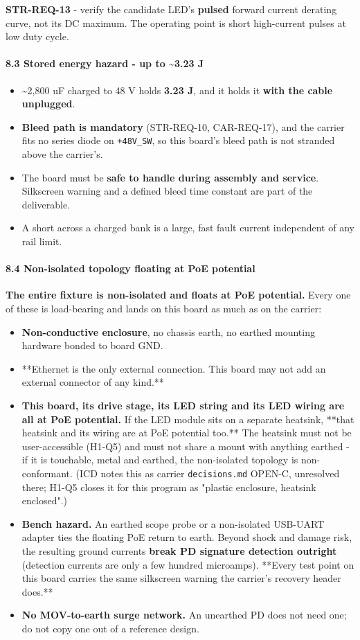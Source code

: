 \documentclass[11pt,a4paper]{article}
\begin{document}
\textbf{STR-REQ-13} - verify the candidate LED's \textbf{pulsed} forward current derating curve, not its DC maximum. The operating point is short high-current pulses at low duty cycle.

\paragraph*{8.3 Stored energy hazard - up to \textasciitilde{}3.23 J}
\begin{itemize}
\item \textasciitilde{}2,800 uF charged to 48 V holds \textbf{3.23 J}, and it holds it \textbf{with the cable unplugged}.
\item \textbf{Bleed path is mandatory} (STR-REQ-10, CAR-REQ-17), and the carrier fits no series diode
on \texttt{+48V\_SW}, so this board's bleed path is not stranded above the carrier's.
\item The board must be \textbf{safe to handle during assembly and service}. Silkscreen warning and a
defined bleed time constant are part of the deliverable.
\item A short across a charged bank is a large, fast fault current independent of any rail limit.
\end{itemize}
\paragraph*{8.4 Non-isolated topology floating at PoE potential}
\textbf{The entire fixture is non-isolated and floats at PoE potential.} Every one of these is load-bearing and lands on this board as much as on the carrier:

\begin{itemize}
\item \textbf{Non-conductive enclosure}, no chassis earth, no earthed mounting hardware bonded to
board GND.
\item {*}{*}Ethernet is the only external connection. This board may not add an external connector of
any kind.{*}{*}
\item \textbf{This board, its drive stage, its LED string and its LED wiring are all at PoE potential.}
If the LED module sits on a separate heatsink, {*}{*}that heatsink and its wiring are at PoE
potential too.{*}{*} The heatsink must not be user-accessible (H1-Q5) and must not share a mount
with anything earthed - if it is touchable, metal and earthed, the non-isolated topology is
non-conformant. (ICD notes this as carrier \texttt{decisions.md} OPEN-C, unresolved there;
H1-Q5 closes it for this program as "plastic enclosure, heatsink enclosed".)
\item \textbf{Bench hazard.} An earthed scope probe or a non-isolated USB-UART adapter ties the
floating PoE return to earth. Beyond shock and damage risk, the resulting ground currents
\textbf{break PD signature detection outright} (detection currents are only a few hundred
microamps). {*}{*}Every test point on this board carries the same silkscreen warning the
carrier's recovery header does.{*}{*}
\item \textbf{No MOV-to-earth surge network.} An unearthed PD does not need one; do not copy one out of
a reference design.
\end{itemize}
\end{document}
